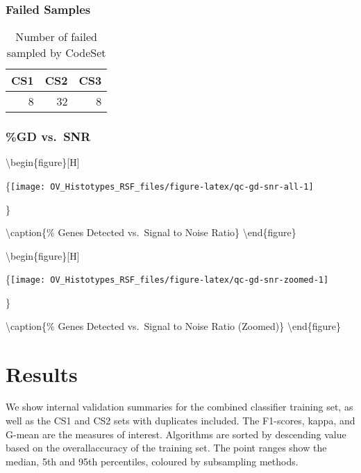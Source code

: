 \documentclass[
]{report}
\begin{document}
\hypertarget{failed-samples}{%
\subsection{Failed Samples}\label{failed-samples}}

\begin{table}

\caption{\label{tab:qc-failed}Number of failed sampled by CodeSet}
\centering
\begin{tabular}[t]{r|r|r}
\hline
CS1 & CS2 & CS3\\
\hline
8 & 32 & 8\\
\hline
\end{tabular}
\end{table}

\hypertarget{gd-vs.-snr}{%
\subsection{\%GD vs.~SNR}\label{gd-vs.-snr}}

\textbackslash begin\{figure\}{[}H{]}

\{\centering \texttt{[image: OV\_Histotypes\_RSF\_files/figure-latex/qc-gd-snr-all-1]}

\}

\textbackslash caption\{\% Genes Detected vs.~Signal to Noise Ratio\}\label{fig:qc-gd-snr-all}
\textbackslash end\{figure\}

\textbackslash begin\{figure\}{[}H{]}

\{\centering \texttt{[image: OV\_Histotypes\_RSF\_files/figure-latex/qc-gd-snr-zoomed-1]}

\}

\textbackslash caption\{\% Genes Detected vs.~Signal to Noise Ratio (Zoomed)\}\label{fig:qc-gd-snr-zoomed}
\textbackslash end\{figure\}

\hypertarget{results}{%
\chapter{Results}\label{results}}

We show internal validation summaries for the combined classifier training set, as well as the CS1 and CS2 sets with duplicates included. The F1-scores, kappa, and G-mean are the measures of interest. Algorithms are sorted by descending value based on the overallaccuracy of the training set. The point ranges show the median, 5th and 95th percentiles, coloured by subsampling methods.
\end{document}
